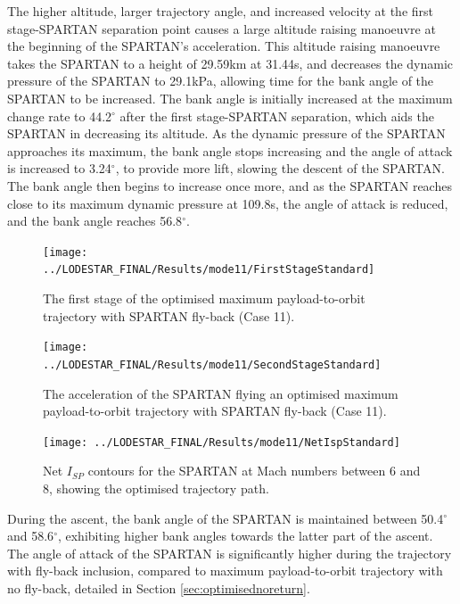  The higher altitude, larger trajectory angle, and increased velocity at the first stage-SPARTAN separation point causes a large altitude raising manoeuvre at the beginning of the SPARTAN's acceleration. This altitude raising manoeuvre takes the SPARTAN to a height of 29.59km at 31.44s, and decreases the dynamic pressure of the SPARTAN to 29.1kPa, allowing time for the bank angle of the SPARTAN to be increased. 
 The bank angle is initially increased at the maximum change rate to 44.2$^\circ$ after the first stage-SPARTAN separation, which aids the SPARTAN in decreasing its altitude. As the dynamic pressure of the SPARTAN approaches its maximum, the bank angle stops increasing and the angle of attack is increased to 3.24$^\circ$, to provide more lift, slowing the descent of the SPARTAN. 
 The bank angle then begins to increase once more, and as the SPARTAN reaches close to its maximum dynamic pressure at 109.8s, the angle of attack is reduced, and the bank angle reaches 56.8$^\circ$. 

\begin{figure}[ht!]
\centering
\texttt{[image: ../LODESTAR\_FINAL/Results/mode11/FirstStageStandard]}
\caption{The first stage of the optimised maximum payload-to-orbit trajectory with SPARTAN fly-back (Case 11). }
\label{fig:FirstStageStandard}
\end{figure}
 
\begin{figure}[ht!]
\centering
\texttt{[image: ../LODESTAR\_FINAL/Results/mode11/SecondStageStandard]}
\caption{The acceleration of the SPARTAN flying an optimised maximum payload-to-orbit trajectory with SPARTAN fly-back (Case 11). }
\label{fig:SecondStageStandard}
\end{figure}
\begin{figure}[ht!]
\centering
\texttt{[image: ../LODESTAR\_FINAL/Results/mode11/NetIspStandard]}
\caption{Net $I_{SP}$ contours for the SPARTAN at Mach numbers between 6 and 8, showing the optimised trajectory path. }
\label{fig:NetIspStandard}
\end{figure}
During the ascent, the bank angle of the SPARTAN is maintained between 50.4$^\circ$ and 58.6$^\circ$, exhibiting higher bank angles towards the latter part of the ascent. 
The angle of attack of the SPARTAN is significantly higher during the trajectory with fly-back inclusion, compared to maximum payload-to-orbit trajectory with no fly-back, detailed in Section \ref{sec:optimisednoreturn}. 

